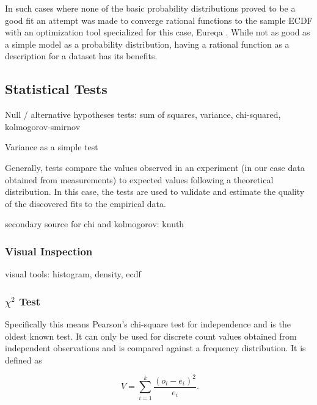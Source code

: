 In such cases where none of the basic probability distributions proved to be a good fit an attempt was made to converge rational functions to the sample \gls{ECDF} with an optimization tool specialized for this case, Eureqa \cite{eureqa_software, eureqa_paper}. While not as good as a simple model as a probability distribution, having a rational function as a description for a dataset has its benefits.






\subsection{Statistical Tests}

Null / alternative hypotheses
tests: sum of squares, variance, chi-squared, kolmogorov-smirnov

Variance as a simple test

Generally, tests compare the values observed in an experiment (in our case data obtained from measurements) to expected values following a theoretical distribution. In this case, the tests are used to validate and estimate the quality of the discovered fits to the empirical data.

secondary source for chi and kolmogorov: knuth \cite{Knuth:1997:ACP:270146}


\subsubsection{Visual Inspection}
visual tools: histogram, density, ecdf


\subsubsection{$\chi^2$ Test}


Specifically this means Pearson's chi-square test for independence\cite{doi:10.1080/14786440009463897} and is the oldest known test. It can only be used for discrete count values obtained from independent observations and is compared against a frequency distribution. It is defined as

\begin{equation}
\phantom{.}V=\sum_{i=1}^{k} \frac{(o_i - e_i)^2}{e_i}\text{.}
\end{equation}

